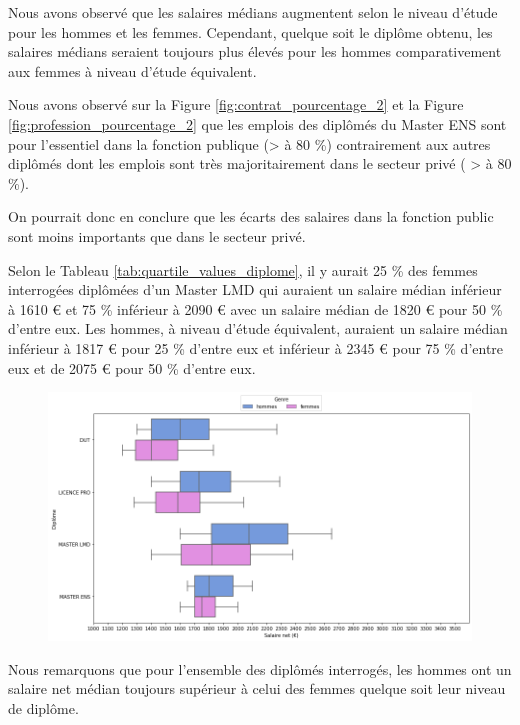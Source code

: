 \documentclass[12pt, a4paper, titlepage, table]{article}
\begin{document}
	Nous avons observé que les salaires médians augmentent selon le niveau d'étude pour les hommes et les femmes. Cependant, quelque soit le diplôme obtenu, les salaires médians seraient toujours plus élevés pour les hommes comparativement aux femmes à niveau d'étude équivalent. 
	
	Nous avons observé sur la Figure \ref{fig:contrat_pourcentage_2} et la Figure \ref{fig:profession_pourcentage_2} que les emplois des diplômés du Master ENS sont pour l'essentiel dans la fonction publique (> à 80 \%) contrairement aux autres diplômés dont les emplois sont très majoritairement dans le secteur privé ( >  à 80 \%).
	
	On pourrait donc en conclure que les écarts des salaires dans la fonction public sont moins importants que dans le secteur privé.
	
	Selon le Tableau \ref{tab:quartile_values_diplome}, il y aurait 25 \% des femmes interrogées diplômées d'un Master LMD qui auraient un salaire médian inférieur à 1610 € et 75 \% inférieur à 2090 € avec un salaire médian de 1820 € pour 50 \% d'entre eux.
	Les hommes, à niveau d'étude équivalent, auraient un salaire médian inférieur à 1817 € pour 25 \% d'entre eux et inférieur à 2345 € pour 75 \% d'entre eux et de 2075 € pour 50 \% d'entre eux.
	

	\begin{figure}[H]
		\centering
		\includegraphics[width=1\textwidth]{../graphs/boxplot_diplomes_genre.png}
		\label{fig:boxplot_diplome_genre}
	\end{figure}

	Nous remarquons que pour l'ensemble des diplômés interrogés, les hommes ont un salaire net médian toujours supérieur à celui des femmes quelque soit leur niveau de diplôme.
\end{document}
